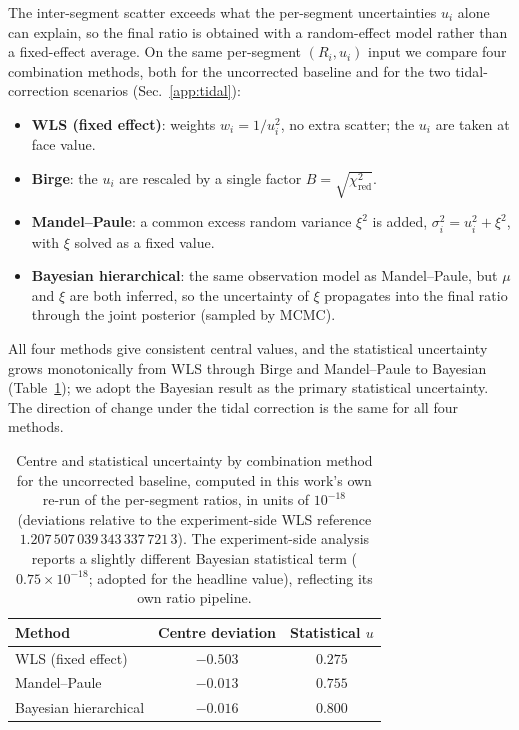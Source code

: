 \documentclass[11pt,a4paper]{article}
\begin{document}
The inter-segment scatter exceeds what the per-segment uncertainties
$u_i$ alone can explain, so the final ratio is obtained with a
random-effect model rather than a fixed-effect average. On the same
per-segment $(R_i, u_i)$ input we compare four combination methods, both
for the uncorrected baseline and for the two tidal-correction scenarios
(Sec.~\ref{app:tidal}):
\begin{itemize}
  \item \textbf{WLS (fixed effect)}: weights $w_i = 1/u_i^{2}$, no
        extra scatter; the $u_i$ are taken at face value.
  \item \textbf{Birge}: the $u_i$ are rescaled by a single factor
        $B = \sqrt{\chi^{2}_{\mathrm{red}}}$.
  \item \textbf{Mandel--Paule}: a common excess random variance
        $\xi^{2}$ is added, $\sigma_i^{2} = u_i^{2} + \xi^{2}$, with
        $\xi$ solved as a fixed value.
  \item \textbf{Bayesian hierarchical}: the same observation model as
        Mandel--Paule, but $\mu$ and $\xi$ are both inferred, so the
        uncertainty of $\xi$ propagates into the final ratio through the
        joint posterior (sampled by MCMC).
\end{itemize}
All four methods give consistent central values, and the statistical
uncertainty grows monotonically from WLS through Birge and Mandel--Paule
to Bayesian (Table~\ref{tab:appendix-methods}); we adopt the Bayesian
result as the primary statistical uncertainty. The direction of change
under the tidal correction is the same for all four methods.

\begin{table}[t]
  \centering
  \caption{Centre and statistical uncertainty by combination method for
  the uncorrected baseline, computed in this work's own re-run of the
  per-segment ratios, in units of $10^{-18}$ (deviations relative
  to the experiment-side WLS reference $1.207\,507\,039\,343\,337\,721\,3$).
  The experiment-side analysis reports a slightly different Bayesian
  statistical term ($0.75\times10^{-18}$; adopted for the headline
  value), reflecting its own ratio pipeline.}
  \label{tab:appendix-methods}
  \begin{tabular}{lcc}
    \toprule
    Method & Centre deviation & Statistical $u$ \\
    \midrule
    WLS (fixed effect)       & $-0.503$ & $0.275$ \\
    Mandel--Paule            & $-0.013$ & $0.755$ \\
    Bayesian hierarchical    & $-0.016$ & $0.800$ \\
    \bottomrule
  \end{tabular}
\end{table}
\end{document}
